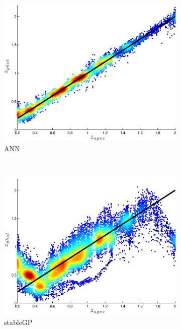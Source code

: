 \documentclass[useAMS,usenatbib,fleqn]{mn2e}
\begin{document}
\begin{figure}
        \centering
        \begin{subfigure}[b]{0.3\textwidth}
                \includegraphics[width=\textwidth]{figures/ANN.eps}
                \caption{ANN}
        \end{subfigure}
        ~
        \begin{subfigure}[b]{0.3\textwidth}
                \includegraphics[width=\textwidth]{figures/stableGP.eps}
                \caption{stableGP}
        \end{subfigure}
        ~
        \begin{subfigure}[b]{0.3\textwidth}

\end{subfigure}
\end{figure}
\end{document}
